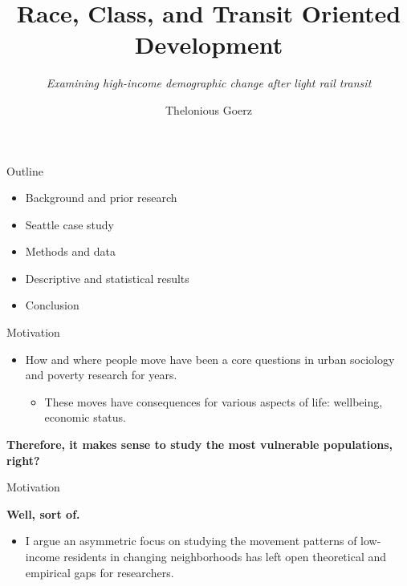 \documentclass[11pt,ignorenonframetext,]{beamer}
\title{Race, Class, and Transit Oriented Development}
\subtitle{\emph{Examining high-income demographic change after light rail transit}}
\author{Thelonious Goerz}
\institute{Dept. of Sociology\\
Johns Hopkins University}
\date{}
\providecommand{\tightlist}{%
  \setlength{\itemsep}{0pt}\setlength{\parskip}{0pt}}
\begin{document}
\frame{\titlepage}

\begin{frame}{Outline}
\protect\hypertarget{outline}{}

\begin{itemize}
\tightlist
\item
  Background and prior research
\item
  Seattle case study
\item
  Methods and data
\item
  Descriptive and statistical results
\item
  Conclusion
\end{itemize}

\end{frame}

\begin{frame}{Motivation}
\protect\hypertarget{motivation}{}

\begin{itemize}
\tightlist
\item
  How and where people move have been a core questions in urban
  sociology and poverty research for years.

  \begin{itemize}
  \tightlist
  \item
    These moves have consequences for various aspects of life:
    wellbeing, economic status.
  \end{itemize}
\end{itemize}

\textbf{Therefore, it makes sense to study the most vulnerable
populations, right?}

\end{frame}

\begin{frame}{Motivation}
\protect\hypertarget{motivation-1}{}

\textbf{Well, sort of.}

\begin{itemize}
\tightlist
\item
  I argue an asymmetric focus on studying the movement patterns of
  low-income residents in changing neighborhoods has left open
  theoretical and empirical gaps for researchers.
\end{itemize}

\end{frame}
\end{document}
